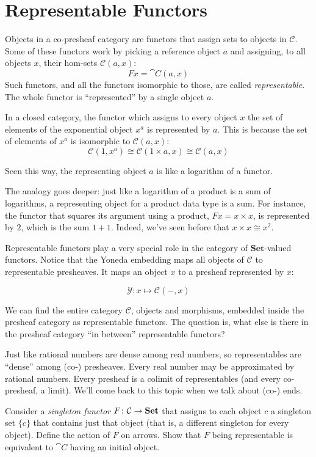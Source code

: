 \documentclass[DaoFP]{subfiles}
\begin{document}
\section{Representable Functors}

Objects in a  co-presheaf category are functors that assign sets to objects in $\mathcal{C}$. Some of these functors work by picking a reference object $a$ and assigning,  to all objects $x$, their hom-sets  $\mathcal{C}(a, x)$:
\[ F x = \cat C(a, x) \]
Such functors, and all the functors isomorphic to those, are called \emph{representable}. The whole functor is ``represented'' by a single object $a$. 

In a closed category, the functor which assigns  to every object $x$ the set of elements of the exponential object $x^a$ is represented by $a$. This is because the set of elements of $x^a$ is isomorphic to $\mathcal{C}(a, x)$:
\[\mathcal{C}(1, x^a) \cong \mathcal{C}(1 \times a, x) \cong \mathcal{C} (a, x)\]

Seen this way, the representing object $a$ is like a logarithm of a functor. 

The analogy goes deeper: just like a logarithm of a product is a sum of logarithms, a representing object for a product data type is a sum. For instance, the functor that squares its argument using a product, $F x = x \times x$, is represented by $2$, which is the sum $1 + 1$. Indeed, we've seen before that $x \times x \cong x^2$.

Representable functors play a very special role in the category of $ \mathbf{Set}$-valued functors. Notice that the Yoneda embedding maps all objects of $\mathcal{C}$ to representable presheaves. It maps an object $x$ to a presheaf represented by $x$: 

\[  \mathcal{Y} \colon x \mapsto \mathcal{C}(-, x) \]

We can find the entire category  $\mathcal{C}$, objects and morphisms, embedded inside the presheaf category as representable functors. The question is, what else is there in the presheaf category ``in between'' representable functors?

Just like rational numbers are dense among real numbers, so representables are ``dense'' among (co-) presheaves. Every real number may be approximated by rational numbers. Every presheaf is a colimit of representables (and every co-presheaf, a limit). We'll come back to this topic when we talk about (co-) ends.

\begin{exercise}
Consider a \emph{singleton functor} $F \colon \mathcal{C} \to \mathbf{Set}$ that assigns to each object $c$ a singleton set $\{c\}$ that contains just that object (that is, a different singleton for every object). Define the action of $F$ on arrows. Show that $F$ being representable is equivalent to $\cat C$ having an initial object.
\end{exercise}
\end{document}
